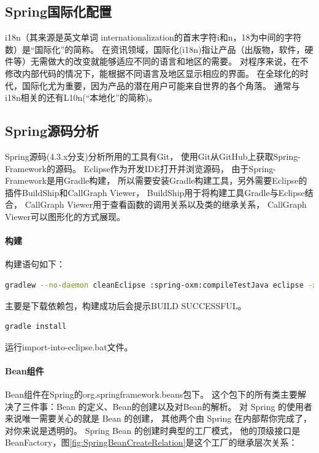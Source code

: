 \documentclass{book}
\begin{document}
\subsection{Spring国际化配置}

i18n（其来源是英文单词 internationalization的首末字符i和n，18为中间的字符数）是“国际化”的简称。
在资讯领域，国际化(i18n)指让产品（出版物，软件，硬件等）无需做大的改变就能够适应不同的语言和地区的需要。
对程序来说，在不修改内部代码的情况下，能根据不同语言及地区显示相应的界面。
在全球化的时代，国际化尤为重要，因为产品的潜在用户可能来自世界的各个角落。
通常与i18n相关的还有L10n(“本地化”的简称)。

\subsection{Spring源码分析}

Spring源码(4.3.x分支)分析所用的工具有Git，
使用Git从GitHub上获取Spring-Framework的源码。
Eclipse作为开发IDE打开并浏览源码，
由于Spring-Framework是用Gradle构建，
所以需要安装Gradle构建工具，另外需要Eclipse的插件BuildShip和CallGraph Viewer，
BuildShip用于将构建工具Gradle与Eclipse结合，
CallGraph Viewer用于查看函数的调用关系以及类的继承关系，
CallGraph Viewer可以图形化的方式展现。

\paragraph{构建}

构建语句如下：

\begin{lstlisting}[language=Bash]
gradlew --no-daemon cleanEclipse :spring-oxm:compileTestJava eclipse -x :eclipse
\end{lstlisting}

主要是下载依赖包，构建成功后会提示BUILD SUCCESSFUL。

\begin{lstlisting}[language=Bash]
gradle install
\end{lstlisting}

运行import-into-eclipse.bat文件。

\paragraph{Bean组件}

Bean组件在Spring的org.springframework.beans包下。
这个包下的所有类主要解决了三件事：Bean 的定义、Bean的创建以及对Bean的解析。
对 Spring 的使用者来说唯一需要关心的就是 Bean 的创建，
其他两个由 Spring 在内部帮你完成了，对你来说是透明的。
Spring Bean 的创建时典型的工厂模式，
他的顶级接口是 BeanFactory，图\ref{fig:SpringBeanCreateRelation}是这个工厂的继承层次关系：
\end{document}
